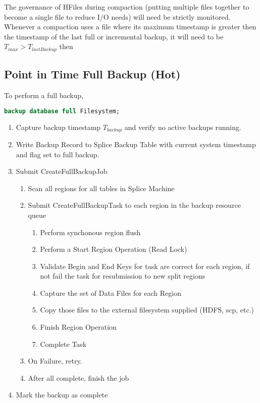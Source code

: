 The governance of HFiles during compaction (putting multiple files together to
become a single file to reduce I/O needs) will need be strictly monitored. 
Whenever a compaction uses a file where its maximum timestamp is greater then
the timestamp of the last full or incremental backup, it will need to be 
$T_{max} > T_{lastBackup}$ then


\subsection{Point in Time Full Backup (Hot)}

To perform a full backup,

\begin{lstlisting}[frame=single,captionpos=b,language=SQL,caption=Procedure to
Perform a Full Backup] 
backup database full Filesystem;
\end{lstlisting}

\begin{enumerate}
	\item Capture backup timestamp $T_{backup}$ and verify no active backups
	running.
	\item Write Backup Record to Splice Backup Table with current system timestamp
	and flag set to full backup.
	\item Submit CreateFullBackupJob 
	\begin{enumerate}
	\item Scan all regions for all tables in Splice Machine
	\item Submit CreateFullBackupTask to each region in the backup resource queue
	\begin{enumerate}
	\item Perform synchonous region flush 
	\item Perform a Start Region Operation (Read Lock)
	\item Validate Begin and End Keys for task are correct for each region, if not
	fail the task for resubmission to new split regions
	\item Capture the set of Data Files for each Region
	\item Copy those files to the external filesystem supplied (HDFS, scp, etc.)
	\item Finish Region Operation
	\item Complete Task
	\end{enumerate}
	\item On Failure, retry.
	\item After all complete, finish the job
	\end{enumerate}
	\item Mark the backup as complete
\end{enumerate}



